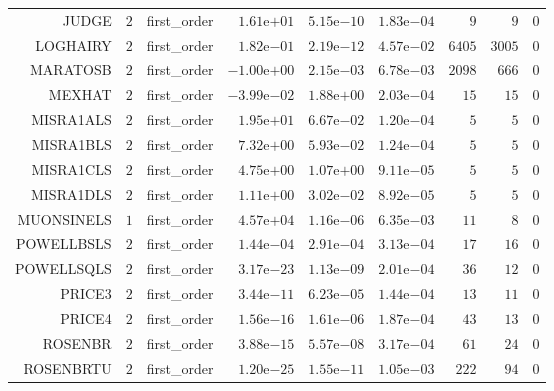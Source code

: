 \begin{longtable}{rrrrrrrrr}
JUDGE & \(     2\) & first\_order & \( 1.61\)e\(+01\) & \( 5.15\)e\(-10\) & \( 1.83\)e\(-04\) & \(     9\) & \(     9\) & \(     0\) \\
LOGHAIRY & \(     2\) & first\_order & \( 1.82\)e\(-01\) & \( 2.19\)e\(-12\) & \( 4.57\)e\(-02\) & \(  6405\) & \(  3005\) & \(     0\) \\
MARATOSB & \(     2\) & first\_order & \(-1.00\)e\(+00\) & \( 2.15\)e\(-03\) & \( 6.78\)e\(-03\) & \(  2098\) & \(   666\) & \(     0\) \\
MEXHAT & \(     2\) & first\_order & \(-3.99\)e\(-02\) & \( 1.88\)e\(+00\) & \( 2.03\)e\(-04\) & \(    15\) & \(    15\) & \(     0\) \\
MISRA1ALS & \(     2\) & first\_order & \( 1.95\)e\(+01\) & \( 6.67\)e\(-02\) & \( 1.20\)e\(-04\) & \(     5\) & \(     5\) & \(     0\) \\
MISRA1BLS & \(     2\) & first\_order & \( 7.32\)e\(+00\) & \( 5.93\)e\(-02\) & \( 1.24\)e\(-04\) & \(     5\) & \(     5\) & \(     0\) \\
MISRA1CLS & \(     2\) & first\_order & \( 4.75\)e\(+00\) & \( 1.07\)e\(+00\) & \( 9.11\)e\(-05\) & \(     5\) & \(     5\) & \(     0\) \\
MISRA1DLS & \(     2\) & first\_order & \( 1.11\)e\(+00\) & \( 3.02\)e\(-02\) & \( 8.92\)e\(-05\) & \(     5\) & \(     5\) & \(     0\) \\
MUONSINELS & \(     1\) & first\_order & \( 4.57\)e\(+04\) & \( 1.16\)e\(-06\) & \( 6.35\)e\(-03\) & \(    11\) & \(     8\) & \(     0\) \\
POWELLBSLS & \(     2\) & first\_order & \( 1.44\)e\(-04\) & \( 2.91\)e\(-04\) & \( 3.13\)e\(-04\) & \(    17\) & \(    16\) & \(     0\) \\
POWELLSQLS & \(     2\) & first\_order & \( 3.17\)e\(-23\) & \( 1.13\)e\(-09\) & \( 2.01\)e\(-04\) & \(    36\) & \(    12\) & \(     0\) \\
PRICE3 & \(     2\) & first\_order & \( 3.44\)e\(-11\) & \( 6.23\)e\(-05\) & \( 1.44\)e\(-04\) & \(    13\) & \(    11\) & \(     0\) \\
PRICE4 & \(     2\) & first\_order & \( 1.56\)e\(-16\) & \( 1.61\)e\(-06\) & \( 1.87\)e\(-04\) & \(    43\) & \(    13\) & \(     0\) \\
ROSENBR & \(     2\) & first\_order & \( 3.88\)e\(-15\) & \( 5.57\)e\(-08\) & \( 3.17\)e\(-04\) & \(    61\) & \(    24\) & \(     0\) \\
ROSENBRTU & \(     2\) & first\_order & \( 1.20\)e\(-25\) & \( 1.55\)e\(-11\) & \( 1.05\)e\(-03\) & \(   222\) & \(    94\) & \(     0\) \\

\end{longtable}
